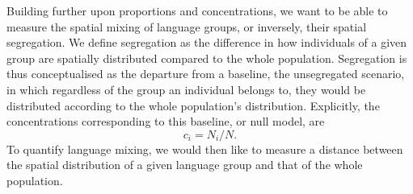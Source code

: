 \documentclass[../thesis.tex]{subfiles}
\begin{document}
Building further upon proportions and concentrations, we want to be able to measure the
spatial mixing of language groups, or inversely, their spatial segregation. We define
segregation as the difference in how individuals of a given group are spatially
distributed compared to the whole population. Segregation is thus conceptualised as the
departure from a baseline, the unsegregated scenario, in which regardless of the group
an individual belongs to, they would be distributed according to the whole population's
distribution. Explicitly, the concentrations corresponding to this baseline, or null
model, are
\begin{equation}
  \label{eq:cell_concentrations}
  c_i = N_i / N.
\end{equation}
To quantify language mixing, we would then like to measure a
distance between the spatial distribution of a given language group and that of the
whole population.
\end{document}

